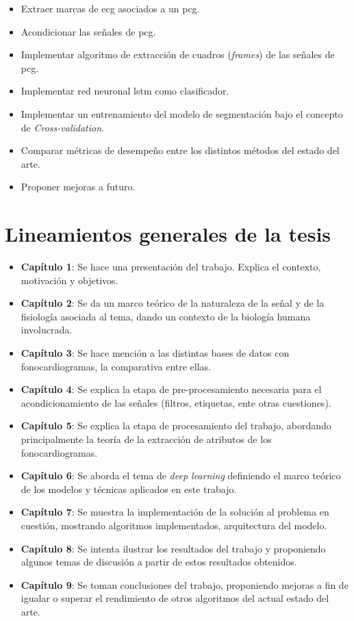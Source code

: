 \begin{itemize}
  \item Extraer marcas de \acrshort{ecg} asociados a un \acrshort{pcg}.
  \item Acondicionar las señales de \acrshort{pcg}.
  \item Implementar algoritmo de extracción de cuadros (\textit{frames}) de las señales de \acrshort{pcg}.
  \item Implementar red neuronal \acrshort{lstm} como clasificador.
  \item Implementar un entrenamiento del modelo de segmentación bajo el concepto de \textit{Cross-validation}.
  \item Comparar métricas de desempeño entre los distintos métodos del estado del arte.
  \item Proponer mejoras a futuro.
\end{itemize}

\newpage

\section{Lineamientos generales de la tesis} \label{sec:general-topics}

\begin{itemize}
  \item \textbf{Capítulo 1}: Se hace una presentación del trabajo. Explica el contexto, motivación y objetivos.
  \item \textbf{Capítulo 2}: Se da un marco teórico de la naturaleza de la señal y de la fisiología asociada al tema,
  dando un contexto de la biología humana involucrada.
  \item \textbf{Capítulo 3}: Se hace mención a las distintas bases de datos con fonocardiogramas, la comparativa entre
  ellas.
  \item \textbf{Capítulo 4}: Se explica la etapa de pre-procesamiento necesaria para el acondicionamiento de las
  señales (filtros, etiquetas, ente otras cuestiones).
  \item \textbf{Capítulo 5}: Se explica la etapa de procesamiento del trabajo, abordando principalmente la teoría
  de la extracción de atributos de los fonocardiogramas.
  \item \textbf{Capítulo 6}: Se aborda el tema de \textit{deep learning} definiendo el marco teórico de los modelos
  y técnicas aplicados en este trabajo.
  \item \textbf{Capítulo 7}: Se muestra la implementación de la solución al problema en cuestión, mostrando algoritmos
  implementados, arquitectura del modelo.
  \item \textbf{Capítulo 8}: Se intenta ilustrar los resultados del trabajo y proponiendo algunos temas de discusión
  a partir de estos resultados obtenidos.
  \item \textbf{Capítulo 9}: Se toman conclusiones del trabajo, proponiendo mejoras a fin de igualar o superar el
  rendimiento de otros algoritmos del actual estado del arte.
\end{itemize}
